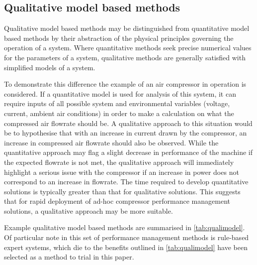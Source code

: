 \subsection{Qualitative model based methods}
\label{subsec:qualimodel}
Qualitative model based methods may be distinguished from quantitative model based methods by their abstraction of the physical principles governing the operation of a system. Where quantitative methods seek precise numerical values for the parameters of a system, qualitative methods are generally satisfied with simplified models of a system.

To demonstrate this difference the example of an air compressor in operation is considered. If a quantitative model is used for analysis of this system, it can require inputs of all possible system and environmental variables (voltage, current, ambient air conditions) in order to make a calculation on what the compressed air flowrate should be. A qualitative approach to this situation would be to hypothesise that with an increase in current drawn by the compressor, an increase in compressed air flowrate should also be observed. While the quantitative approach may flag a slight decrease in performance of the machine if the expected flowrate is not met, the qualitative approach will immediately highlight a serious issue with the compressor if an increase in power does not correspond to an increase in flowrate. The time required to develop quantitative solutions is typically greater than that for qualitative solutions. This suggests that for rapid deployment of ad-hoc compressor performance management solutions, a qualitative approach may be more suitable.

Example qualitative model based methods are summarised in \autoref{tab:qualimodel}. Of particular note in this set of performance management methods is rule-based expert systems, which die to the benefits outlined in \autoref{tab:qualimodel} have been selected as a method to trial in this paper.

